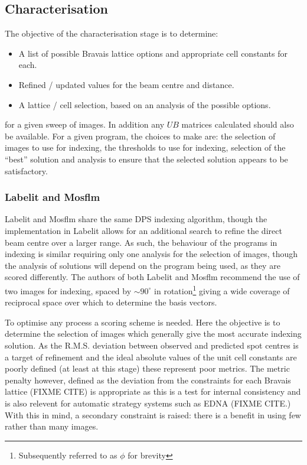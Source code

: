 \documentclass[a4paper,11pt]{article}
\begin{document}
\subsection{Characterisation}

The objective of the characterisation stage is to determine:

\begin{itemize}
\item{A list of possible Bravais lattice options and appropriate cell
    constants for each.}
\item{Refined / updated values for the beam centre and distance.}
\item{A lattice / cell selection, based on an analysis of the possible
    options.}
\end{itemize}

\noindent
for a given sweep of images. In addition any $UB$ matrices calculated
should also be available. For a given program, the choices to make
are: the selection of images to use for indexing, the thresholds to
use for indexing, selection of the ``best'' solution and analysis to
ensure that the selected solution appears to be satisfactory. 

\subsubsection{Labelit and Mosflm}

Labelit and Mosflm share the same DPS indexing algorithm, though the
implementation in Labelit allows for an additional search to refine
the direct beam centre over a larger range. As such, the behaviour of
the programs in indexing is similar requiring only one analysis for
the selection of images, though the analysis of solutions will depend
on the program being used, as they are scored differently.
The authors of both Labelit and Mosflm recommend the use of two images
for indexing, spaced by $\sim 90^{\circ}$ in rotation\footnote{Subsequently
referred to as $\phi$ for brevity} giving a wide coverage of
reciprocal space over which to determine the basis vectors. 

To optimise any process a scoring scheme is needed. Here the objective
is to determine the selection of images which generally give the most
accurate indexing solution. As the R.M.S. deviation between observed
and predicted spot centres is a target of refinement and the ideal absolute
values of the unit cell constants are poorly defined (at least at this
stage) these represent poor metrics. The metric penalty however,
defined as the deviation from the constraints for each Bravais lattice
(FIXME CITE) is appropriate as this is a test for internal consistency
and is also relevent for automatic strategy systems such as EDNA
(FIXME CITE.) With this in mind, a secondary constraint is raised:
there is a benefit in using few rather than many images.
\end{document}
